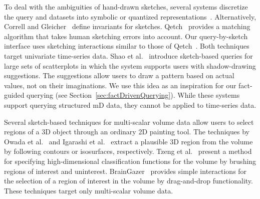 To deal with the ambiguities of hand-drawn sketches, several systems discretize the query and datasets into symbolic or quantized representations~\cite{Muthumanickam2016,ruta2019sax}.
%
Alternatively, Correll and Gleicher~\cite{Correll2016} define invariants for sketches. %
Qetch~\cite{Mannino2018} provides a matching algorithm that takes human sketching errors into account.
Our query-by-sketch interface uses sketching interactions similar to those of Qetch~\cite{Mannino2018}.
Both techniques target univariate time-series data.
%
Shao et al.~\cite{Shao2014} introduce sketch-based queries for large sets of scatterplots
in which the system supports users with shadow-drawing suggestions. %
The suggestions allow users to draw a pattern based on actual values, not on their imaginations.
We use this idea as an inspiration for our fact-guided querying (see Section~\ref{sec:factDrivenQuerying}).
While these systems support querying structured mD data, they cannot be applied to time-series data.

Several sketch-based techniques for multi-scalar volume data allow users to select regions of a 3D object through an ordinary 2D painting tool.
The techniques by Owada et al.~\cite{Owada2005} and Igarashi et al.~\cite{Igarashi2016} extract a plausible 3D region from the volume
by following contours or isosurfaces, respectively.
Tzeng et al.~\cite{Tzeng2003} present a method for specifying high-dimensional classification functions for the volume
by brushing regions of interest and uninterest. %
BrainGazer~\cite{Bruckner2009} provides simple interactions for the selection of a region of interest in the volume
by drag-and-drop functionality.
These techniques target only multi-scalar volume data. 

